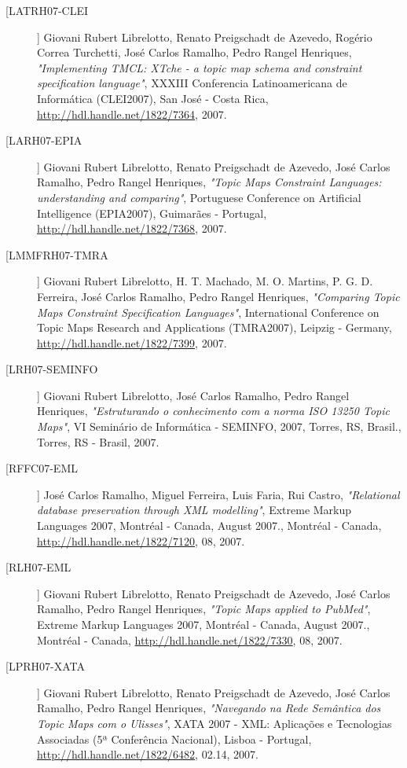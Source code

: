 \begin{description}
\item[[LATRH07-CLEI]]
    \textsf{Giovani Rubert Librelotto, Renato Preigschadt de Azevedo, Rogério Correa Turchetti, José Carlos Ramalho, Pedro Rangel Henriques}, \emph{"Implementing TMCL: XTche - a topic map schema and constraint specification language"}, XXXIII Conferencia Latinoamericana de Informática (CLEI2007), San José - Costa Rica, \url{http://hdl.handle.net/1822/7364}, 2007.

\item[[LARH07-EPIA]]
    \textsf{Giovani Rubert Librelotto, Renato Preigschadt de Azevedo, José Carlos Ramalho, Pedro Rangel Henriques}, \emph{"Topic Maps Constraint Languages: understanding and comparing"}, Portuguese Conference on Artificial Intelligence (EPIA2007), Guimarães - Portugal, \url{http://hdl.handle.net/1822/7368}, 2007.

\item[[LMMFRH07-TMRA]]
    \textsf{Giovani Rubert Librelotto, H. T. Machado, M. O. Martins, P. G. D. Ferreira, José Carlos Ramalho, Pedro Rangel Henriques}, \emph{"Comparing Topic Maps Constraint Specification Languages"}, International Conference on Topic Maps Research and Applications (TMRA2007), Leipzig - Germany, \url{http://hdl.handle.net/1822/7399}, 2007.

\item[[LRH07-SEMINFO]]
    \textsf{Giovani Rubert Librelotto, José Carlos Ramalho, Pedro Rangel Henriques}, \emph{"Estruturando o conhecimento com a norma ISO 13250 Topic Maps"}, VI Seminário de Informática - SEMINFO, 2007, Torres, RS, Brasil., Torres, RS - Brasil, 2007.

\item[[RFFC07-EML]]
    \textsf{José Carlos Ramalho, Miguel Ferreira, Luis Faria, Rui Castro}, \emph{"Relational database preservation through XML modelling"}, Extreme Markup Languages 2007, Montréal - Canada, August 2007., Montréal - Canada, \url{http://hdl.handle.net/1822/7120}, 08, 2007.

\item[[RLH07-EML]]
    \textsf{Giovani Rubert Librelotto, Renato Preigschadt de Azevedo, José Carlos Ramalho, Pedro Rangel Henriques}, \emph{"Topic Maps applied to PubMed"}, Extreme Markup Languages 2007, Montréal - Canada, August 2007., Montréal - Canada, \url{http://hdl.handle.net/1822/7330}, 08, 2007.

\item[[LPRH07-XATA]]
    \textsf{Giovani Rubert Librelotto, Renato Preigschadt de Azevedo, José Carlos Ramalho, Pedro Rangel Henriques}, \emph{"Navegando na Rede Semântica dos Topic Maps com o Ulisses"}, XATA 2007 -  XML: Aplicações e Tecnologias Associadas (5ª Conferência Nacional), Lisboa - Portugal, \url{http://hdl.handle.net/1822/6482}, 02.14, 2007.


\end{description}
